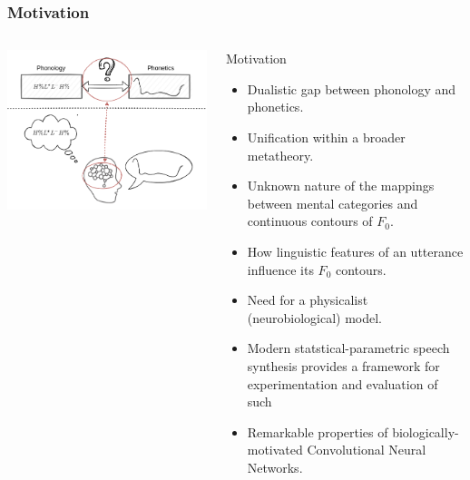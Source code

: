 \documentclass[a4paper,9pt]{beamer}
\theoremstyle{mytheoremstyle}
\begin{document}
\begin{frame}
\frametitle{Motivation}
\begin{columns}
\begin{center}
\includegraphics[width=\textwidth]{res/mapping_highlight.png}
\end{center}
\scriptsize{
\begin{exampleblock}{Motivation}
\begin{itemize}
\item[\checkmark] Dualistic gap between phonology and phonetics.
\item[\checkmark] Unification within a broader metatheory.
\item[\checkmark] Unknown nature of the mappings between mental categories and continuous contours of $F_{0}$.
\item[\checkmark] How linguistic features of an utterance influence its $F_{0}$ contours.
\item[\checkmark] Need for a physicalist (neurobiological) model.
\item[\checkmark] Modern statstical-parametric speech synthesis provides a framework for experimentation and evaluation of such
\item[\checkmark] Remarkable properties of biologically-motivated Convolutional Neural Networks.
\end{itemize}
\end{exampleblock}
}
\end{columns}
\end{frame}
\end{document}
